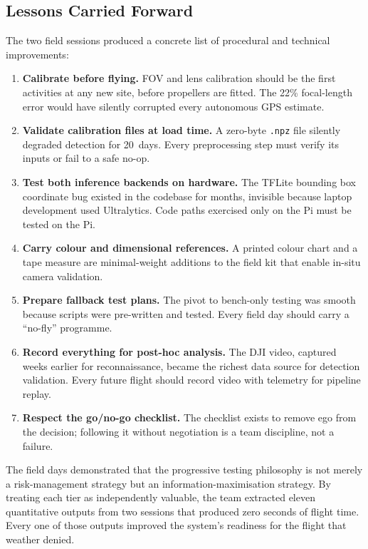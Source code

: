 \subsection{Lessons Carried Forward}\label{sec:field-lessons}

The two field sessions produced a concrete list of procedural and technical improvements:

\begin{enumerate}
    \item \textbf{Calibrate before flying.}  FOV and lens calibration should be the first activities at any new site, before propellers are fitted.  The 22\% focal-length error would have silently corrupted every autonomous GPS estimate.
    \item \textbf{Validate calibration files at load time.}  A zero-byte \texttt{.npz} file silently degraded detection for 20~days.  Every preprocessing step must verify its inputs or fail to a safe no-op.
    \item \textbf{Test both inference backends on hardware.}  The TFLite bounding box coordinate bug existed in the codebase for months, invisible because laptop development used Ultralytics.  Code paths exercised only on the Pi must be tested on the Pi.
    \item \textbf{Carry colour and dimensional references.}  A printed colour chart and a tape measure are minimal-weight additions to the field kit that enable in-situ camera validation.
    \item \textbf{Prepare fallback test plans.}  The pivot to bench-only testing was smooth because scripts were pre-written and tested.  Every field day should carry a ``no-fly'' programme.
    \item \textbf{Record everything for post-hoc analysis.}  The DJI video, captured weeks earlier for reconnaissance, became the richest data source for detection validation.  Every future flight should record video with telemetry for pipeline replay.
    \item \textbf{Respect the go/no-go checklist.}  The checklist exists to remove ego from the decision; following it without negotiation is a team discipline, not a failure.
\end{enumerate}

The field days demonstrated that the progressive testing philosophy is not merely a risk-management strategy but an information-maximisation strategy.  By treating each tier as independently valuable, the team extracted eleven quantitative outputs from two sessions that produced zero seconds of flight time.  Every one of those outputs improved the system's readiness for the flight that weather denied.
